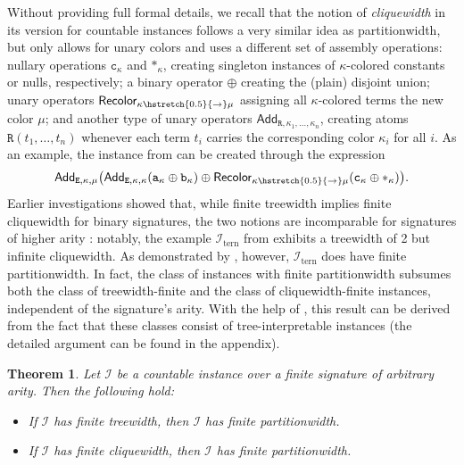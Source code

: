 \documentclass[10pt,a4paper]{amsart}
\theoremstyle{definition}
\numberwithin{equation}{section}
\theoremstyle{plain}
\newtheorem{theorem}[theorem]{Theorem}
\theoremstyle{definition}
\theoremstyle{myexample}
\theoremstyle{plain}
\theoremstyle{definition}
\newcommand{\instance}{\mathcal{I}}
\newcommand{\inst}{\instance}
\newcommand{\Ercwidth}{\Partitionwidth}
\newcommand{\ercwidth}{\partitionwidth}
\newcommand{\Partitionwidth}{Par\-ti\-tion\-width}
\newcommand{\partitionwidth}{par\-ti\-tion\-width}
\newcommand{\fcn}[1]{\mathsf{#1}}
\newcommand{\pred}[1]{\mathtt{#1}}
\newcommand{\rpred}{\pred{R}}
\newcommand{\shortto}{\hstretch{0.5}{\to}}
\begin{document}
Without providing full formal details, we recall that the notion of \emph{cliquewidth} in its version for countable instances \cite{ICDT2023} follows a very similar idea as \ercwidth{}, but only allows for unary colors and uses a different set of assembly operations: nullary operations $\pred{c}_\kappa$ and $\pred{*}_\kappa$, creating singleton instances of $\kappa$-colored constants or nulls, respectively;
a binary operator $\oplus$ creating the (plain) disjoint union; unary operators $\fcn{Recolor}_{\kappa\shortto\mu}$ assigning all $\kappa$-colored terms the new color $\mu$; and another type of unary operators $\fcn{Add}_{\pred{R},\kappa_1,...,\kappa_n}$, creating atoms $\rpred(t_1,\ldots,t_n)$ whenever each term $t_i$ carries the corresponding color $\kappa_i$ for all $i$. As an example, the instance from  can be created through the expression
$$ \fcn{Add}_{\pred{E},\kappa,\mu}\big(\fcn{Add}_{\pred{E},\kappa,\kappa}(\pred{a}_\kappa \oplus \pred{b}_\kappa)  \oplus \fcn{Recolor}_{\kappa\shortto\mu}( \pred{c}_\kappa \oplus \pred{*}_\kappa )\big). $$%
Earlier investigations showed that, while finite treewidth implies finite cliquewidth for binary signatures, the two notions are incomparable for signatures of higher arity \cite{ICDT2023}: notably, the example $\inst_\mathrm{tern}$ from  exhibits a treewidth of 2 but infinite cliquewidth.
%
As demonstrated by , however, $\inst_\mathrm{tern}$ does have finite \ercwidth{}. In fact, the class of instances with finite \ercwidth{} subsumes both the class of treewidth-finite and the class of cliquewidth-finite instances, independent of the signature's arity. With the help of , this result can be derived from the fact that these classes consist of tree-interpretable instances (the detailed argument can be found in the appendix).

\begin{theorem}\label{thm:tree-width-implies-clique-width}
Let $\inst$ be a countable instance over a finite signature of arbitrary arity. Then the following hold:
\begin{itemize}
    \item If $\inst$ has finite treewidth, then $\inst$ has finite \ercwidth{}.
    \item If $\inst$ has finite cliquewidth, then $\inst$ has finite \ercwidth{}.
\end{itemize}
\end{theorem}


\end{document}
